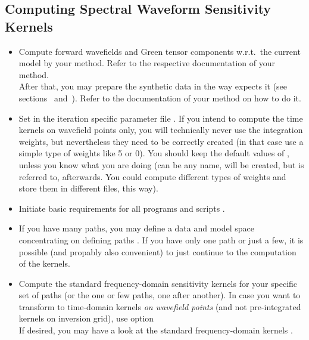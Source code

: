 \subsection*{Computing Spectral Waveform Sensitivity Kernels}
%
\begin{itemize}
\item Compute forward wavefields and Green tensor components w.r.t.\ the current model 
by your method. Refer to the respective documentation of your method.\\
After that, you may prepare the synthetic data in the way \ASKI{} expects it (see sections~ 
and~). Refer to the documentation of your method on how to do it.
%
\item Set  in the iteration specific parameter file 
. If you intend to compute the time kernels on wavefield points only, you will technically
never use the integration weights, but nevertheless they need to be correctly created (in that case use a simple
type of weights like 5 or 0).
You should keep the default values of ,
unless you know what you are doing (can be any name, will be created, but is referred to, afterwards. 
You could compute different types of weights and store them in different files, this way). 
%
\item Initiate basic requirements for all programs and scripts .
%
\item If you have many paths, you may define a data and model space concentrating on defining paths 
  .
  If you have only one path or just a few, it is possible (and propably also convenient) to just continue to the
  computation of the kernels.
%
\item Compute the standard frequency-domain sensitivity kernels for your specific set of paths (or the one or 
  few paths, one after another). In case you want to transform to time-domain kernels \emph{on wavefield points} 
  (and not pre-integrated kernels on inversion grid),
  use option   \\
  If desired, you may have a look at the standard frequency-domain kernels .
\end{itemize}
%
